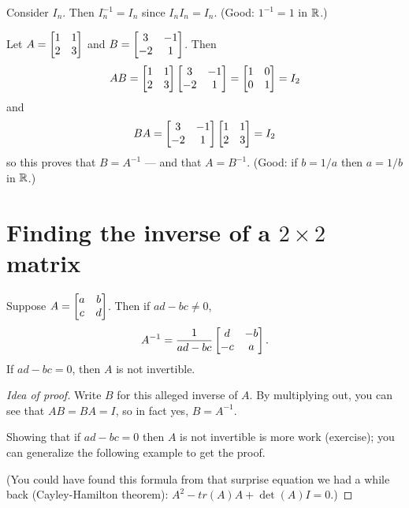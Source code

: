 \begin{myexample}  Consider $I_n$.  Then $I_n^{-1} = I_n$ since $I_n I_n = I_n$.
(Good:  $1^{-1} = 1$ in $\mathbb{R}$.) \end{myexample}

\begin{myexample} Let $A = \left[ \begin{matrix} 1 & 1 \\ 2& 3 \end{matrix} \right]$ and $B = \left[ \begin{matrix} 3 & -1\\ -2 & 1 \end{matrix} \right]$.
Then 
$$
AB = \left[ \begin{matrix} 1 & 1 \\ 2& 3 \end{matrix} \right]\left[ \begin{matrix} 3 & -1\\ -2 & 1 \end{matrix} \right] = \left[ \begin{matrix} 1&0\\0&1 \end{matrix} \right] = I_2
$$
and
$$
BA = \left[ \begin{matrix} 3 & -1\\ -2 & 1 \end{matrix} \right] \left[ \begin{matrix} 1 & 1 \\ 2& 3 \end{matrix} \right] = I_2
$$
so this proves that $B = A^{-1}$ --- and that $A = B^{-1}$.  (Good:  if $b=1/a$ then $a=1/b$ in $\mathbb{R}$.) \end{myexample}

\section{Finding the inverse of a $2\times 2$ matrix}

\begin{lemma}\label{inverse2by2}
Suppose $A = \left[ \begin{matrix} a & b \\ c& d \end{matrix} \right]$.  Then if $ad-bc \neq 0$, 
$$
A^{-1} = \frac{1}{ad-bc} \left[ \begin{matrix} d & -b \\ -c & a \end{matrix} \right].
$$
If $ad-bc=0$, then $A$ is not invertible.
\end{lemma}

\begin{proof}[Idea of proof]
Write $B$ for this alleged inverse of $A$. 
By multiplying out, you can see that $AB = BA = I$, so in fact
yes, $B = A^{-1}$.  

Showing that if $ad-bc=0$ then $A$ is not invertible is more
work (exercise); you can generalize the following example to
get the proof.

(You could have found this formula from that surprise equation
we had a while back (Cayley-Hamilton theorem):  $A^2 - tr(A)A + \det(A)I=0$.)
\end{proof}


